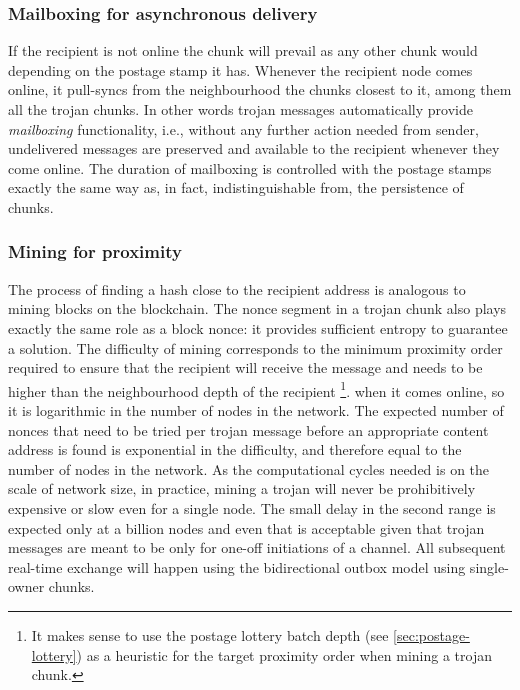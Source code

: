 \subsubsection{Mailboxing for asynchronous delivery}

If the recipient is not online the chunk will prevail as any other chunk would depending on the postage stamp it has. Whenever the recipient node comes online, it pull-syncs from the neighbourhood the chunks closest to it, among them all the trojan chunks. In other words trojan messages automatically provide \emph{mailboxing} functionality, i.e., 
without any further action needed from sender, undelivered messages are preserved and available to the recipient whenever they come online. The duration of mailboxing is controlled with the postage stamps exactly the same way as, in fact, indistinguishable from, the persistence of chunks. 

\subsubsection{Mining for proximity}

The process of finding a hash close to the recipient address is analogous to mining blocks on the blockchain. The nonce segment in a trojan chunk also plays exactly the same role as a block nonce: it provides sufficient entropy to guarantee a solution. The difficulty of mining corresponds to the minimum proximity order required to ensure that the recipient will receive the message and needs to be higher than the neighbourhood depth of the recipient%
%
\footnote{It makes sense to use the postage lottery batch depth (see \ref{sec:postage-lottery}) as a heuristic for the target proximity order when mining a trojan chunk.}.
%
when it comes online, so it is logarithmic in the number of nodes in the network. The expected number of nonces that need to be tried per trojan message before an appropriate content address is found is exponential in the difficulty, and therefore equal to the number of nodes in the network. As the computational cycles needed is on the scale of network size, in practice, mining a trojan will never be prohibitively expensive or slow even for a single node. The small delay in the second range is expected only at a billion nodes and even that is acceptable given that trojan messages are meant to be only for one-off initiations of a channel. All subsequent real-time exchange will happen using the bidirectional outbox model using single-owner chunks.

